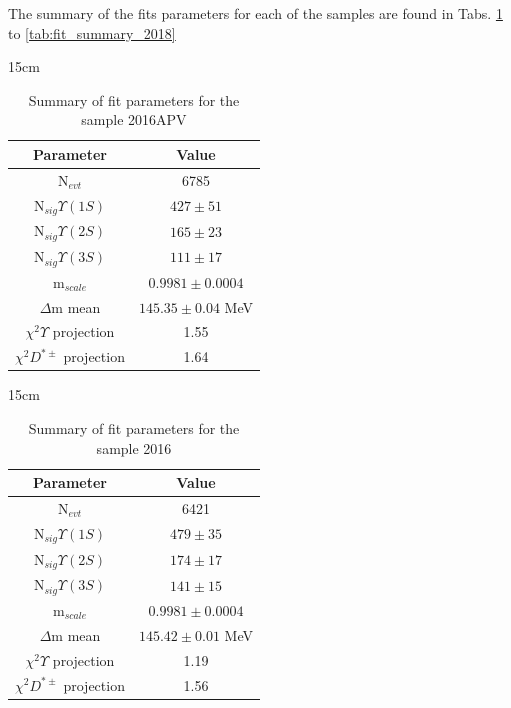The summary of the fits parameters for each of the samples are found in Tabs. \ref{tab:fit_summary_2016APV} to \ref{tab:fit_summary_2018}

\begin{table}[!htbp]{15cm}
  \caption{Summary of fit parameters for the sample 2016APV}\label{tab:fit_summary_2016APV}
  \begin{tabular}{ c | c }
    Parameter                    & Value                 \\
    \hline
    N$_{evt}$                    & 6785                  \\ \hline
    N$_{sig} \Upsilon(1S)$       & $427 \pm 51$          \\ \hline
    N$_{sig} \Upsilon(2S)$       & $165 \pm 23$          \\ \hline
    N$_{sig} \Upsilon(3S)$       & $111 \pm 17$          \\ \hline
    m$_{scale}$                  & $0.9981 \pm 0.0004$   \\ \hline
    $\Delta$m mean               & $145.35 \pm 0.04$ MeV \\ \hline
    $\chi^2 \Upsilon$ projection & 1.55                  \\ \hline
    $\chi^2 D^{*\pm}$ projection & 1.64                  \\ \hline
  \end{tabular}
\end{table}

\begin{table}[!htbp]{15cm}
  \caption{Summary of fit parameters for the sample 2016}\label{tab:fit_summary_2016}
  \begin{tabular}{ c | c }
    Parameter                    & Value                 \\
    \hline
    N$_{evt}$                    & 6421                  \\ \hline
    N$_{sig} \Upsilon(1S)$       & $479 \pm 35$          \\ \hline
    N$_{sig} \Upsilon(2S)$       & $174 \pm 17$          \\ \hline
    N$_{sig} \Upsilon(3S)$       & $141 \pm 15$          \\ \hline
    m$_{scale}$                  & $0.9981 \pm 0.0004$   \\ \hline
    $\Delta$m mean               & $145.42 \pm 0.01$ MeV \\ \hline
    $\chi^2 \Upsilon$ projection & 1.19                  \\ \hline
    $\chi^2 D^{*\pm}$ projection & 1.56                  \\ \hline
  \end{tabular}
\end{table}

